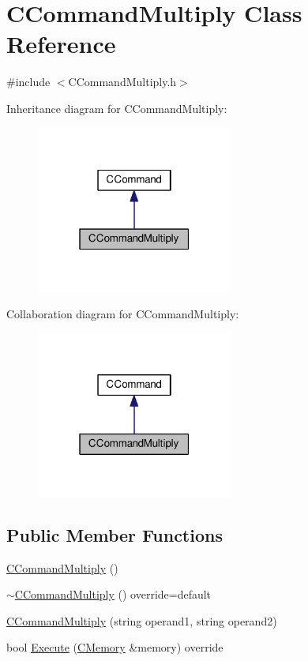 \hypertarget{classCCommandMultiply}{}\section{C\+Command\+Multiply Class Reference}
\label{classCCommandMultiply}


{\ttfamily \#include $<$C\+Command\+Multiply.\+h$>$}



Inheritance diagram for C\+Command\+Multiply\+:\nopagebreak
\begin{figure}[H]
\begin{center}
\leavevmode
\includegraphics[width=183pt]{classCCommandMultiply__inherit__graph}
\end{center}
\end{figure}


Collaboration diagram for C\+Command\+Multiply\+:\nopagebreak
\begin{figure}[H]
\begin{center}
\leavevmode
\includegraphics[width=183pt]{classCCommandMultiply__coll__graph}
\end{center}
\end{figure}
\subsection*{Public Member Functions}
\begin{DoxyCompactItemize}
\item 
\hyperlink{classCCommandMultiply_a197041ecfb102aaf78c87d5e283cc9c1}{C\+Command\+Multiply} ()
\item 
\hyperlink{classCCommandMultiply_a791709da46cb4b6578880d65ecfa304a}{$\sim$\+C\+Command\+Multiply} () override=default
\item 
\hyperlink{classCCommandMultiply_abdd4d23d9a7c8aeecfc2a32e365759a9}{C\+Command\+Multiply} (string operand1, string operand2)
\item 
bool \hyperlink{classCCommandMultiply_a06d75c2d7c89607406de6c05e586907f}{Execute} (\hyperlink{classCMemory}{C\+Memory} \&memory) override
\end{DoxyCompactItemize}
